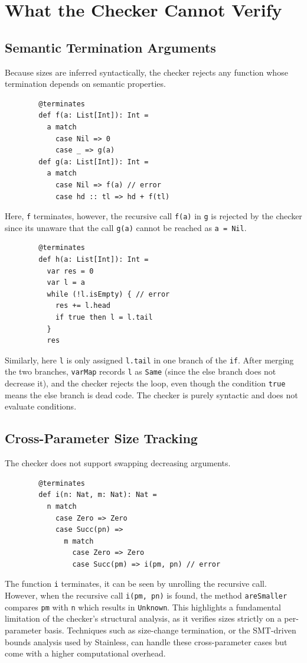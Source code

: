 \section{What the Checker Cannot Verify}
\subsection{Semantic Termination Arguments}
Because sizes are inferred syntactically, the checker rejects any function whose
termination depends on semantic properties.
\begin{verbatim}
        @terminates
        def f(a: List[Int]): Int =
          a match
            case Nil => 0
            case _ => g(a)
        def g(a: List[Int]): Int =
          a match
            case Nil => f(a) // error
            case hd :: tl => hd + f(tl)
\end{verbatim}
Here, \texttt{f} terminates, however, the recursive call \texttt{f(a)} in
\texttt{g} is rejected by the checker since its unaware that the call
\texttt{g(a)} cannot be reached as \texttt{a = Nil}.

\begin{verbatim}
        @terminates
        def h(a: List[Int]): Int =
          var res = 0
          var l = a
          while (!l.isEmpty) { // error
            res += l.head
            if true then l = l.tail
          }
          res
\end{verbatim}
Similarly, here \texttt{l} is only assigned \texttt{l.tail} in one branch of the
\texttt{if}. After merging the two branches, \texttt{varMap} records \texttt{l}
as \texttt{Same} (since the else branch does not decrease it), and the checker
rejects the loop, even though the condition \texttt{true} means the else branch
is dead code. The checker is purely syntactic and does not evaluate conditions.

\subsection{Cross-Parameter Size Tracking}
The checker does not support swapping decreasing arguments.
\begin{verbatim}
        @terminates
        def i(n: Nat, m: Nat): Nat =
          n match
            case Zero => Zero
            case Succ(pn) =>
              m match
                case Zero => Zero
                case Succ(pm) => i(pm, pn) // error
\end{verbatim}
The function \texttt{i} terminates, it can be seen by unrolling the recursive
call. However, when the recursive call \texttt{i(pm, pn)} is found, the method
\texttt{areSmaller} compares \texttt{pm} with \texttt{n} which results in
\texttt{Unknown}. 
This highlights a fundamental limitation of the checker's structural analysis,
as it verifies sizes strictly on a per-parameter basis. Techniques such as
size-change termination, or the SMT-driven bounds analysis used by Stainless,
can handle these cross-parameter cases but come with a higher computational
overhead.


